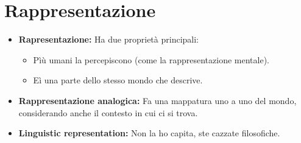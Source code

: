 \documentclass{book}
\begin{document}
    \section{Rappresentazione}
    \begin{itemize}
        \item \textbf{Rapresentazione:} Ha due proprietà principali:
            \begin{itemize}
                \item Pìù umani la percepiscono (come la rappresentazione mentale).
                \item Eì una parte dello stesso mondo che descrive.
            \end{itemize}
        \item \textbf{Rappresentazione analogica:} Fa una mappatura uno a uno del mondo, considerando anche il contesto in cui ci si trova.
        \item \textbf{Linguistic representation:} Non la ho capita, ste cazzate filosofiche.
    \end{itemize}
\end{document}
